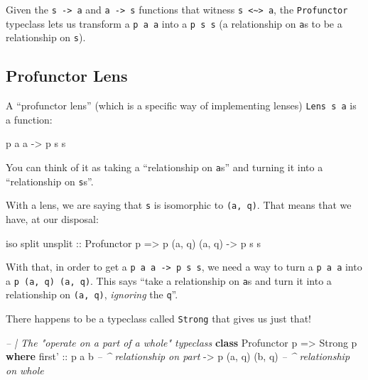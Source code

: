 \documentclass[]{article}
\newenvironment{Shaded}{}{}
\newcommand{\CommentTok}[1]{\textcolor[rgb]{0.38,0.63,0.69}{\textit{#1}}}
\newcommand{\DataTypeTok}[1]{\textcolor[rgb]{0.56,0.13,0.00}{#1}}
\newcommand{\KeywordTok}[1]{\textcolor[rgb]{0.00,0.44,0.13}{\textbf{#1}}}
\newcommand{\NormalTok}[1]{#1}
\newcommand{\OtherTok}[1]{\textcolor[rgb]{0.00,0.44,0.13}{#1}}
\begin{document}
Given the \texttt{s\ -\textgreater{}\ a} and \texttt{a\ -\textgreater{}\ s}
functions that witness
\texttt{s\ \textless{}\textasciitilde{}\textgreater{}\ a}, the
\texttt{Profunctor} typeclass lets us transform a \texttt{p\ a\ a} into a
\texttt{p\ s\ s} (a relationship on \texttt{a}s to be a relationship on
\texttt{s}).

\hypertarget{profunctor-lens}{%
\subsection{Profunctor Lens}\label{profunctor-lens}}

A ``profunctor lens'' (which is a specific way of implementing lenses)
\texttt{Lens\textquotesingle{}\ s\ a} is a function:

\begin{Shaded}
\begin{Highlighting}[]
\NormalTok{p a a }\OtherTok{->}\NormalTok{ p s s}
\end{Highlighting}
\end{Shaded}

You can think of it as taking a ``relationship on \texttt{a}s'' and turning it
into a ``relationship on \texttt{s}s''.

With a lens, we are saying that \texttt{s} is isomorphic to \texttt{(a,\ q)}.
That means that we have, at our disposal:

\begin{Shaded}
\begin{Highlighting}[]
\NormalTok{iso split unsplit}
\OtherTok{    ::} \DataTypeTok{Profunctor}\NormalTok{ p}
    \OtherTok{=>}\NormalTok{ p (a, q) (a, q)}
    \OtherTok{->}\NormalTok{ p s s}
\end{Highlighting}
\end{Shaded}

With that, in order to get a \texttt{p\ a\ a\ -\textgreater{}\ p\ s\ s}, we need
a way to turn a \texttt{p\ a\ a} into a \texttt{p\ (a,\ q)\ (a,\ q)}. This says
``take a relationship on \texttt{a}s and turn it into a relationship on
\texttt{(a,\ q)}, \emph{ignoring} the \texttt{q}''.

There happens to be a typeclass called \texttt{Strong} that gives us just that!

\begin{Shaded}
\begin{Highlighting}[]
\CommentTok{-- | The "operate on a part of a whole" typeclass}
\KeywordTok{class} \DataTypeTok{Profunctor}\NormalTok{ p }\OtherTok{=>} \DataTypeTok{Strong}\NormalTok{ p }\KeywordTok{where}
\NormalTok{    first'}
\OtherTok{        ::}\NormalTok{ p a b                }\CommentTok{-- ^ relationship on part}
        \OtherTok{->}\NormalTok{ p (a, q) (b, q)      }\CommentTok{-- ^ relationship on whole}
\end{Highlighting}
\end{Shaded}
\end{document}
